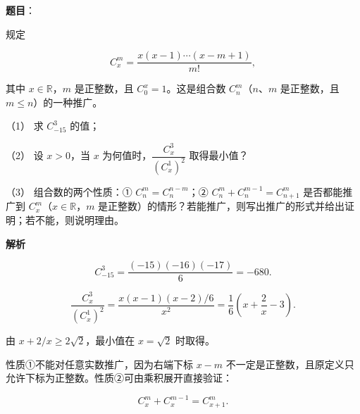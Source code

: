 \begin{answer}

\textbf{题目}：

规定

\nopagebreak[4]
\[
C_x^m=\frac{x(x-1)\cdots(x-m+1)}{m!},
\]

其中 $x\in\mathbb R$，$m$ 是正整数，且 $C_0^x=1$。这是组合数 $C_n^m$（$n\text{、}m$ 是正整数，且 $m\le n$）的一种推广。

（1） 求 $C_{-15}^3$ 的值；

（2） 设 $x>0$，当 $x$ 为何值时，$\dfrac{C_x^3}{(C_x^1)^2}$ 取得最小值？

（3） 组合数的两个性质：① $C_n^m=C_n^{n-m}$；② $C_n^m+C_n^{m-1}=C_{n+1}^m$ 是否都能推广到 $C_x^m$（$x\in\mathbb R$，$m$ 是正整数）的情形？若能推广，则写出推广的形式并给出证明；若不能，则说明理由。

\textbf{解析}


\nopagebreak[4]
\[
C_{-15}^3=\frac{(-15)(-16)(-17)}6=-680.
\]


\nopagebreak[4]
\[
\frac{C_x^3}{(C_x^1)^2}
=\frac{x(x-1)(x-2)/6}{x^2}
=\frac16\left(x+\frac2x-3\right).
\]

由 $x+2/x\ge2\sqrt2$，最小值在 $x=\sqrt2$ 时取得。


性质①不能对任意实数推广，因为右端下标 $x-m$ 不一定是正整数，且原定义只允许下标为正整数。性质②可由乘积展开直接验证：

\nopagebreak[4]
\[
C_x^m+C_x^{m-1}=C_{x+1}^m.
\]




\end{answer}